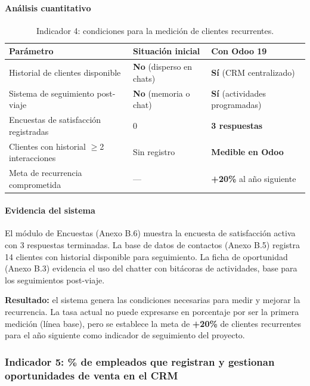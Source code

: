 \paragraph{Análisis cuantitativo}
\begin{table}[htbp]
\centering
\renewcommand{\arraystretch}{1.3}
\begin{tabular}{|p{5.5cm}|p{2.5cm}|p{2.5cm}|}
\hline
\textbf{Parámetro} & \textbf{Situación inicial} & \textbf{Con Odoo 19} \\ \hline
Historial de clientes disponible & \textbf{No} (disperso en chats) & \textbf{Sí} (CRM centralizado) \\ \hline
Sistema de seguimiento post-viaje & \textbf{No} (memoria o chat) & \textbf{Sí} (actividades programadas) \\ \hline
Encuestas de satisfacción registradas & 0 & \textbf{3 respuestas} \\ \hline
Clientes con historial $\geq$2 interacciones & Sin registro & \textbf{Medible en Odoo} \\ \hline
Meta de recurrencia comprometida & --- & \textbf{+20\%} al año siguiente \\ \hline
\end{tabular}
\caption{Indicador 4: condiciones para la medición de clientes recurrentes.}
\end{table}

\paragraph{Evidencia del sistema}
El módulo de Encuestas (Anexo B.6) muestra la encuesta de satisfacción activa con 3 respuestas terminadas. La base de datos de contactos (Anexo B.5) registra 14 clientes con historial disponible para seguimiento. La ficha de oportunidad (Anexo B.3) evidencia el uso del chatter con bitácoras de actividades, base para los seguimientos post-viaje.

\textbf{Resultado:} el sistema genera las condiciones necesarias para medir y mejorar la recurrencia. La tasa actual no puede expresarse en porcentaje por ser la primera medición (línea base), pero se establece la meta de \textbf{+20\%} de clientes recurrentes para el año siguiente como indicador de seguimiento del proyecto.

\subsubsection{Indicador 5: \% de empleados que registran y gestionan oportunidades de venta en el CRM}


